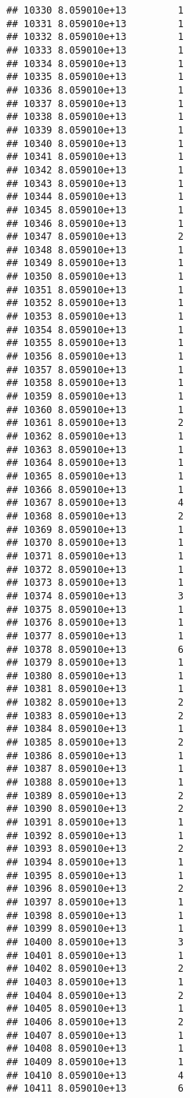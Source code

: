 \documentclass[
]{article}
\begin{document}
\begin{verbatim}
## 10330 8.059010e+13         1
## 10331 8.059010e+13         1
## 10332 8.059010e+13         1
## 10333 8.059010e+13         1
## 10334 8.059010e+13         1
## 10335 8.059010e+13         1
## 10336 8.059010e+13         1
## 10337 8.059010e+13         1
## 10338 8.059010e+13         1
## 10339 8.059010e+13         1
## 10340 8.059010e+13         1
## 10341 8.059010e+13         1
## 10342 8.059010e+13         1
## 10343 8.059010e+13         1
## 10344 8.059010e+13         1
## 10345 8.059010e+13         1
## 10346 8.059010e+13         1
## 10347 8.059010e+13         2
## 10348 8.059010e+13         1
## 10349 8.059010e+13         1
## 10350 8.059010e+13         1
## 10351 8.059010e+13         1
## 10352 8.059010e+13         1
## 10353 8.059010e+13         1
## 10354 8.059010e+13         1
## 10355 8.059010e+13         1
## 10356 8.059010e+13         1
## 10357 8.059010e+13         1
## 10358 8.059010e+13         1
## 10359 8.059010e+13         1
## 10360 8.059010e+13         1
## 10361 8.059010e+13         2
## 10362 8.059010e+13         1
## 10363 8.059010e+13         1
## 10364 8.059010e+13         1
## 10365 8.059010e+13         1
## 10366 8.059010e+13         1
## 10367 8.059010e+13         4
## 10368 8.059010e+13         2
## 10369 8.059010e+13         1
## 10370 8.059010e+13         1
## 10371 8.059010e+13         1
## 10372 8.059010e+13         1
## 10373 8.059010e+13         1
## 10374 8.059010e+13         3
## 10375 8.059010e+13         1
## 10376 8.059010e+13         1
## 10377 8.059010e+13         1
## 10378 8.059010e+13         6
## 10379 8.059010e+13         1
## 10380 8.059010e+13         1
## 10381 8.059010e+13         1
## 10382 8.059010e+13         2
## 10383 8.059010e+13         2
## 10384 8.059010e+13         1
## 10385 8.059010e+13         2
## 10386 8.059010e+13         1
## 10387 8.059010e+13         1
## 10388 8.059010e+13         1
## 10389 8.059010e+13         2
## 10390 8.059010e+13         2
## 10391 8.059010e+13         1
## 10392 8.059010e+13         1
## 10393 8.059010e+13         2
## 10394 8.059010e+13         1
## 10395 8.059010e+13         1
## 10396 8.059010e+13         2
## 10397 8.059010e+13         1
## 10398 8.059010e+13         1
## 10399 8.059010e+13         1
## 10400 8.059010e+13         3
## 10401 8.059010e+13         1
## 10402 8.059010e+13         2
## 10403 8.059010e+13         1
## 10404 8.059010e+13         2
## 10405 8.059010e+13         1
## 10406 8.059010e+13         2
## 10407 8.059010e+13         1
## 10408 8.059010e+13         1
## 10409 8.059010e+13         1
## 10410 8.059010e+13         4
## 10411 8.059010e+13         6

\end{verbatim}
\end{document}
